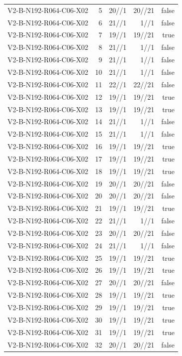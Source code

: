{\begin{longtable}{lrrrr}
V2-B-N192-R064-C06-X02 & 5 & 20//1 & 20//21 & false \\
V2-B-N192-R064-C06-X02 & 6 & 21//1 & 1//1 & false \\
V2-B-N192-R064-C06-X02 & 7 & 19//1 & 19//21 & true \\
V2-B-N192-R064-C06-X02 & 8 & 21//1 & 1//1 & false \\
V2-B-N192-R064-C06-X02 & 9 & 21//1 & 1//1 & false \\
V2-B-N192-R064-C06-X02 & 10 & 21//1 & 1//1 & false \\
V2-B-N192-R064-C06-X02 & 11 & 22//1 & 22//21 & false \\
V2-B-N192-R064-C06-X02 & 12 & 19//1 & 19//21 & true \\
V2-B-N192-R064-C06-X02 & 13 & 19//1 & 19//21 & true \\
V2-B-N192-R064-C06-X02 & 14 & 21//1 & 1//1 & false \\
V2-B-N192-R064-C06-X02 & 15 & 21//1 & 1//1 & false \\
V2-B-N192-R064-C06-X02 & 16 & 19//1 & 19//21 & true \\
V2-B-N192-R064-C06-X02 & 17 & 19//1 & 19//21 & true \\
V2-B-N192-R064-C06-X02 & 18 & 19//1 & 19//21 & true \\
V2-B-N192-R064-C06-X02 & 19 & 20//1 & 20//21 & false \\
V2-B-N192-R064-C06-X02 & 20 & 20//1 & 20//21 & false \\
V2-B-N192-R064-C06-X02 & 21 & 19//1 & 19//21 & true \\
V2-B-N192-R064-C06-X02 & 22 & 21//1 & 1//1 & false \\
V2-B-N192-R064-C06-X02 & 23 & 20//1 & 20//21 & false \\
V2-B-N192-R064-C06-X02 & 24 & 21//1 & 1//1 & false \\
V2-B-N192-R064-C06-X02 & 25 & 19//1 & 19//21 & true \\
V2-B-N192-R064-C06-X02 & 26 & 19//1 & 19//21 & true \\
V2-B-N192-R064-C06-X02 & 27 & 20//1 & 20//21 & false \\
V2-B-N192-R064-C06-X02 & 28 & 19//1 & 19//21 & true \\
V2-B-N192-R064-C06-X02 & 29 & 19//1 & 19//21 & true \\
V2-B-N192-R064-C06-X02 & 30 & 19//1 & 19//21 & true \\
V2-B-N192-R064-C06-X02 & 31 & 19//1 & 19//21 & true \\
V2-B-N192-R064-C06-X02 & 32 & 20//1 & 20//21 & false \\

\end{longtable}}

